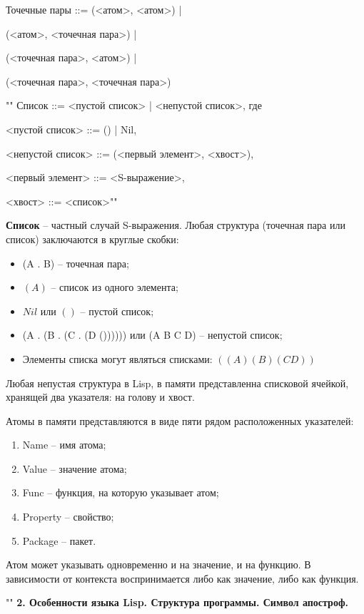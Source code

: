 \documentclass[12pt]{report}
\begin{document}
Точечные пары ::= (<атом>, <атом>) |

(<атом>, <точечная пара>) |

(<точечная пара>, <атом>) |

(<точечная пара>, <точечная пара>)


""\newline
\indent Список ::= <пустой список> | <непустой список>, где

<пустой список> ::= () | Nil,

<непустой список> ::= (<первый элемент>, <хвост>),

<первый элемент> ::= <S-выражение>,

<хвост> ::= <список>""\newline

\indent \textbf{Список} -- частный случай S-выражения. Любая структура (точечная пара или список) заключаются в круглые скобки:

\begin{itemize}
	\item (A . B) -- точечная пара;
	\item $(A)$ -- список из одного элемента;
	\item $Nil$ или $()$ -- пустой список;
	\item (A . (B . (C . (D ()))))) или (A B C D) -- непустой список;
	\item Элементы списка могут являться списками: $((A)(B)(CD))$
\end{itemize}

Любая непустая структура в Lisp, в памяти представленна списковой ячейкой, хранящей два указателя: на голову и хвост.

Атомы в памяти представляются в виде пяти рядом расположенных указателей: 

\begin{enumerate}
	\item Name -- имя атома;
	\item Value -- значение атома;
	\item Func -- функция, на которую указывает атом;
	\item Property -- свойство;
	\item Package -- пакет.
\end{enumerate}

Атом может указывать одновременно и на значение, и на функцию. В зависимости от контекста воспринимается либо как значение, либо как функция.

""\newline
\textbf{2. Особенности языка Lisp. Структура программы. Символ апостроф.}
\end{document}
